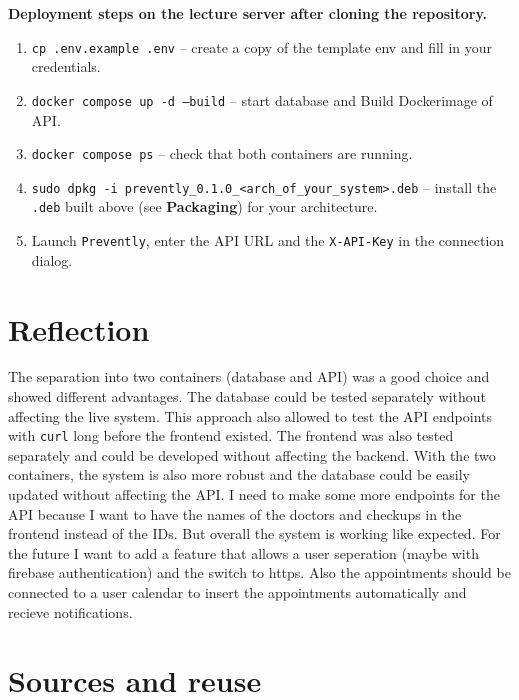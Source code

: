\documentclass[11pt,a4paper]{article}
\begin{document}
\textbf{Deployment steps on the lecture server after cloning the repository.}
\begin{enumerate}[leftmargin=1.6em, topsep=2pt]
  \item \texttt{cp .env.example .env} -- create a copy of the template env and fill in your credentials.
  \item \texttt{docker compose up -d --build} -- start database and Build Dockerimage of API.
  \item \texttt{docker compose ps} -- check that both containers are running.
  \item \texttt{sudo dpkg -i prevently\_0.1.0\_<arch\_of\_your\_system>.deb} -- install the \texttt{.deb} built above (see \textbf{Packaging}) for your architecture.
  \item Launch \texttt{Prevently}, enter the API URL and the
        \texttt{X-API-Key} in the connection dialog.
\end{enumerate}

\section{Reflection}
The separation into two containers (database and API) was a good choice and showed different advantages.
The database could be tested separately without affecting the live system. This approach also allowed to 
test the API endpoints with \texttt{curl} long before the frontend existed. 
The frontend was also tested separately and could be developed without affecting the backend. With the two containers,
the system is also more robust and the database could be easily updated without affecting the API. I need to make some more 
endpoints for the API because I want to have the names of the doctors and checkups in the frontend instead of the IDs.
But overall the system is working like expected. For the future I want to add a feature that allows 
a user seperation (maybe with firebase authentication) and the switch to https. Also the appointments should be connected to a 
user calendar to insert the appointments automatically and recieve notifications.

\section*{Sources and reuse}
\end{document}
